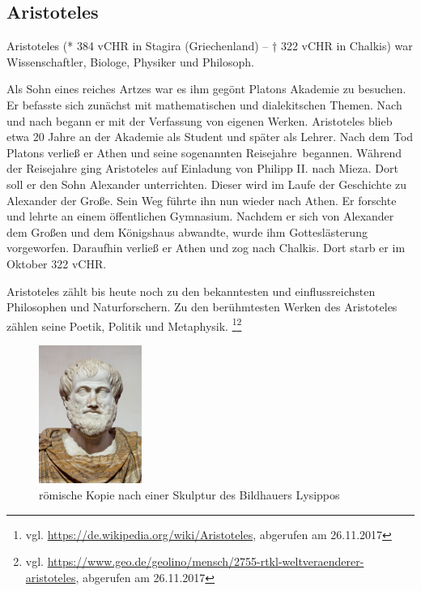 \subsection{Aristoteles}
Aristoteles (* 384 \ac{vCHR} in Stagira (Griechenland) – † 322 \ac{vCHR} in Chalkis) war Wissenschaftler, Biologe, Physiker und Philosoph. 

Als Sohn eines reiches Artzes war es ihm gegönt Platons Akademie zu besuchen. Er befasste sich zunächst mit mathematischen und dialekitschen Themen. Nach und nach begann er mit der Verfassung von eigenen Werken. Aristoteles blieb etwa 20 Jahre an der Akademie als Student und später als Lehrer. Nach dem Tod Platons verließ er Athen und seine sogenannten \glqq Reisejahre\grqq\ begannen. Während der Reisejahre ging Aristoteles auf Einladung von Philipp II. nach Mieza. Dort soll er den Sohn Alexander unterrichten. Dieser wird im Laufe der Geschichte zu Alexander der Große. Sein Weg führte ihn nun wieder nach Athen. Er forschte und lehrte an einem öffentlichen Gymnasium. Nachdem er sich von Alexander dem Großen und dem Königshaus abwandte, wurde ihm Gotteslästerung vorgeworfen. Daraufhin verließ er Athen und zog nach Chalkis. Dort starb er im Oktober 322 \ac{vCHR}. 

Aristoteles zählt bis heute noch zu den bekanntesten und einflussreichsten Philosophen und Naturforschern. Zu den berühmtesten Werken des Aristoteles zählen seine Poetik, Politik und Metaphysik.
\footnote{vgl. \url{https://de.wikipedia.org/wiki/Aristoteles}, abgerufen am 26.11.2017}\footnote{vgl. \url{https://www.geo.de/geolino/mensch/2755-rtkl-weltveraenderer-aristoteles}, abgerufen am 26.11.2017}

\begin{figure}[H]
\centering 
 \includegraphics[width=0.3\textwidth]{Bilder/kap3/Aristoteles} 
 \caption{römische Kopie nach einer Skulptur des Bildhauers Lysippos \cite{WikiAR}  \label{portraitAristotles}}
\end{figure}

